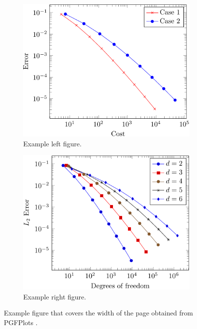 \documentclass[9pt,a4paper,twoside]{tau-class/tau}
\begin{document}
        \begin{figure}[tp] %
		\centering
		  \begin{subfigure}[b]{0.38\linewidth} %
			\includegraphics[width=\linewidth]{figures/Example2}
			\caption{Example left figure.}
			\label{fig:figa}
		\end{subfigure}
			\hspace{20pt}   %
		\begin{subfigure}[b]{0.375\linewidth} %
			\includegraphics[width=\linewidth]{figures/Example3}
			\caption{Example right figure.}
			\label{fig:figb}
		\end{subfigure}
		\caption{Example figure that covers the width of the page obtained from PGFPlots \cite{PFGPlots}.}
		\label{fig:examplefloat}
	\end{figure}
\end{document}
